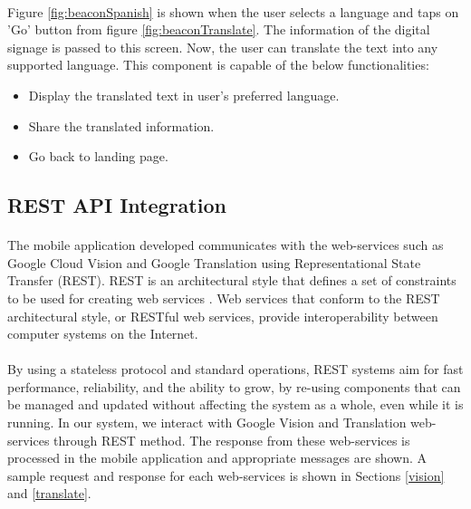\documentclass[12pt]{article}
\begin{document}
\paragraph{}Figure \ref{fig:beaconSpanish} is shown when the user selects a language and taps on 'Go' button from figure \ref{fig:beaconTranslate}. The information of the digital signage is passed to this screen. Now, the user can translate the text into any supported language. This component is capable of the below functionalities:

\begin{itemize}
	\item Display the translated text in user's preferred language.
	\item Share the translated information.
	\item Go back to landing page.
\end{itemize}




\subsection{REST API Integration}
\paragraph{} The mobile application developed communicates with the web-services such as Google Cloud Vision and Google Translation using Representational State Transfer (REST).  REST is an 
architectural style that defines a set of constraints to be used for creating web services \cite{rest}. Web services that conform to the REST architectural style, or RESTful web services, provide interoperability between computer systems on the Internet.

\paragraph{}By using a stateless protocol and standard operations, REST systems aim for fast performance, reliability, and the ability to grow, by re-using components that can be managed and updated without affecting the system as a whole, even while it is running. In our system, we interact with Google Vision and Translation web-services through REST method. The response from these web-services is processed in the mobile application and appropriate messages are shown. A sample request and response for each web-services is shown in Sections \ref{vision} and \ref{translate}.
\end{document}
